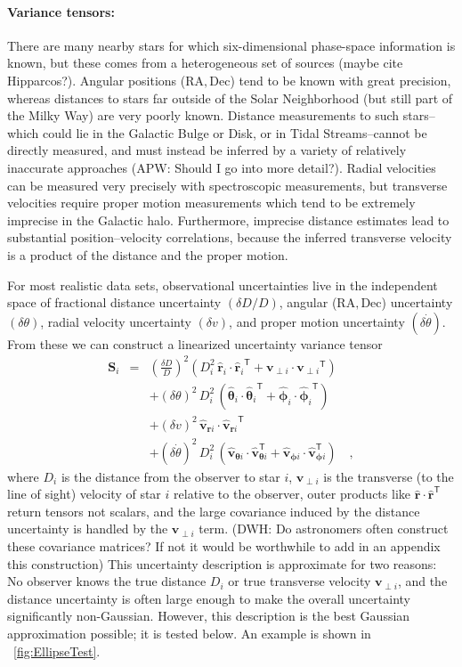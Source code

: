 \documentclass[12pt,preprint]{aastex}
\newcommand{\mtensor}[1]{\boldsymbol{#1}}
\newcommand{\mS}{\mtensor{S}}
\newcommand{\mvector}[1]{\mtensor{#1}}
\renewcommand{\vr}{\mvector{r}}
\newcommand{\vv}{\mvector{v}}
\newcommand{\vtheta}{\mvector{\theta}}
\newcommand{\vphi}{\mvector{\phi}}
\newcommand{\transpose}[1]{{#1}^{\textsf{T}}}
\newcommand{\rhat}{\hat{\vr}}
\newcommand{\thetahat}{\hat{\vtheta}}
\newcommand{\phihat}{\hat{\vphi}}
\newcommand{\vhat}{\hat{\vv}}
\newcommand{\RA}{\mathrm{RA}}
\newcommand{\Dec}{\mathrm{Dec}}
\begin{document}
\paragraph{Variance tensors:}
There are many nearby stars for which six-dimensional phase-space
information is known, but these comes from a heterogeneous set of
sources (maybe cite Hipparcos?). Angular positions ($\RA, \Dec$) tend
to be known with great precision, whereas distances to stars far
outside of the Solar Neighborhood (but still part of the Milky Way)
are very poorly known. Distance measurements to such stars--which
could lie in the Galactic Bulge or Disk, or in Tidal Streams--cannot
be directly measured, and must instead be inferred by a variety of
relatively inaccurate approaches (APW: Should I go into more detail?).
Radial velocities can be measured very precisely with spectroscopic
measurements, but transverse velocities require proper motion
measurements which tend to be extremely imprecise in the Galactic halo.
Furthermore, imprecise distance estimates lead to substantial
position--velocity correlations, because the inferred transverse
velocity is a product of the distance and the proper motion.

For most realistic data sets, observational uncertainties live in the
independent space of fractional distance uncertainty $(\delta D/D)$,
angular ($\RA, \Dec$) uncertainty $(\delta\theta)$, radial velocity
uncertainty $(\delta v)$, and proper motion uncertainty
$(\delta\dot{\theta})$.  From these we can construct a linearized
uncertainty variance tensor
\begin{eqnarray}\displaystyle
\mS_i &=&
  \left(\frac{\delta D}{D}\right)^2
    (D_i^2\,\rhat_i\cdot\transpose{\rhat_i} +
      \vv_{\perp i}\cdot\transpose{\vv_{\perp i}})
\nonumber\\
&&+ (\delta\theta)^2\,D_i^2\,
    (\thetahat_i\cdot\transpose{\thetahat_i}
   + \phihat_i\cdot\transpose{\phihat_i})
\nonumber\\
&&+ (\delta v)^2\,\vhat_{\vr i}\cdot\transpose{\vhat_{\vr i}}
\nonumber\\
&&+ (\delta\dot{\theta})^2\,D_i^2\,
    (\vhat_{\vtheta i}\cdot\transpose\vhat_{\vtheta i}
   + \vhat_{\vphi i}\cdot\transpose\vhat_{\vphi i})
\quad ,
\end{eqnarray}
where $D_i$ is the distance from the observer to star $i$, $\vv_{\perp
  i}$ is the transverse (to the line of sight) velocity of star $i$
relative to the observer, outer products like
$\rhat\cdot\transpose{\rhat}$ return tensors not scalars, and the
large covariance induced by the distance uncertainty is handled by the
$\vv_{\perp i}$ term.  
 (DWH: Do astronomers often construct these covariance matrices? If not it would be worthwhile to add in 
an appendix this construction)
This uncertainty description is approximate for
two reasons: No observer knows the true distance $D_i$ or true
transverse velocity $\vv_{\perp i}$, and the distance uncertainty is
often large enough to make the overall uncertainty significantly
non-Gaussian. However, this description is the best Gaussian
approximation possible; it is tested below.  An example is shown in
\figurename~\ref{fig:EllipseTest}.
\end{document}
